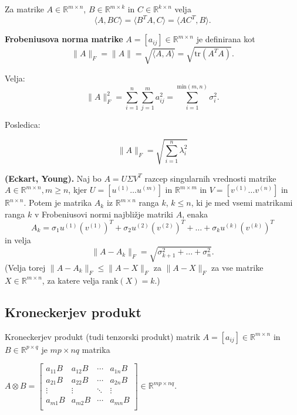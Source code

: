 \documentclass{article}
\begin{document}
\begin{multicols}{2}
Za matrike \( A \in \mathbb{R}^{m \times n} \), \( B \in \mathbb{R}^{m \times k} \) in \( C \in \mathbb{R}^{k \times n} \) velja
\[
\langle A, BC \rangle = \langle B^T A, C \rangle = \langle A C^T, B \rangle.
\]


\textbf{Frobeniusova norma matrike} \( A = [a_{ij}] \in \mathbb{R}^{m \times n} \) je definirana kot
\[
\|A\|_F = \|A\| = \sqrt{\langle A, A \rangle} = \sqrt{\text{tr}(A^T A)}.
\]

Velja:
\[
\|A\|_F^2 = \sum_{i=1}^{n} \sum_{j=1}^{m} a_{ij}^2 = \sum_{i=1}^{\text{min}(m,n)} \sigma_i^2.
\]

Posledica:

\[
\|A\|_F = \sqrt{\sum_{i=1}^{n} \lambda_i^2}
\]

\textbf{(Eckart, Young).} Naj bo \( A = U\Sigma V^T \) razcep singularnih vrednosti matrike \( A \in \mathbb{R}^{m \times n}, m \geq n \), kjer \( U = [u^{(1)} \ldots u^{(m)}] \) in \( \mathbb{R}^{m \times m} \) in \( V = [v^{(1)} \ldots v^{(n)}] \) in \( \mathbb{R}^{n \times n} \). Potem je matrika \( A_k \) iz \( \mathbb{R}^{m \times n} \) ranga \( k \), \( k \leq n \), ki je med vsemi matrikami ranga \( k \) v Frobeniusovi normi najbližje matriki \( A \), enaka
\[
A_k = \sigma_1 u^{(1)}(v^{(1)})^T + \sigma_2 u^{(2)}(v^{(2)})^T + \ldots + \sigma_k u^{(k)}(v^{(k)})^T
\]
in velja
\[
\| A - A_k \|_F = \sqrt{\sigma_{k+1}^2 + \ldots + \sigma_n^2}.
\]
(Velja torej \( \|A - A_k\|_F \leq \|A - X\|_F \) za \( \|A - X\|_F \) za vse matrike \( X \in \mathbb{R}^{m \times n} \), za katere velja \( \text{rank}(X) = k \).)

\subsection{Kroneckerjev produkt}

Kroneckerjev produkt (tudi tenzorski produkt) matrik \( A = [a_{ij}] \in \mathbb{R}^{m \times n} \) in \( B \in \mathbb{R}^{p \times q} \) je \( mp \times nq \) matrika

\begin{math}
A \otimes B = 
\begin{bmatrix}
a_{11}B & a_{12}B & \cdots & a_{1n}B \\
a_{21}B & a_{22}B & \cdots & a_{2n}B \\
\vdots  & \vdots  & \ddots & \vdots  \\
a_{m1}B & a_{m2}B & \cdots & a_{mn}B \\
\end{bmatrix}
\in \mathbb{R}^{mp \times nq}.
\end{math}


\end{multicols}
\end{document}
